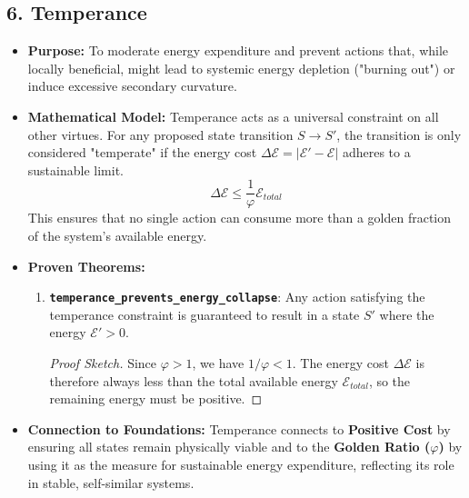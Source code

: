 \documentclass[11pt,a4paper]{article}
\begin{document}
\begin{itemize}
\subsection{6. Temperance}
\begin{itemize}
    \item \textbf{Purpose:} To moderate energy expenditure and prevent actions that, while locally beneficial, might lead to systemic energy depletion ("burning out") or induce excessive secondary curvature.
    \item \textbf{Mathematical Model:} Temperance acts as a universal constraint on all other virtues. For any proposed state transition $S \to S'$, the transition is only considered "temperate" if the energy cost $\Delta \mathcal{E} = |\mathcal{E}' - \mathcal{E}|$ adheres to a sustainable limit.
        \[ \Delta \mathcal{E} \le \frac{1}{\varphi} \mathcal{E}_{total} \]
        This ensures that no single action can consume more than a golden fraction of the system's available energy.
    \item \textbf{Proven Theorems:}
        \begin{enumerate}
            \item \textbf{\texttt{temperance\_prevents\_energy\_collapse}}: Any action satisfying the temperance constraint is guaranteed to result in a state $S'$ where the energy $\mathcal{E}' > 0$.
                \begin{proof}[Proof Sketch]
                    Since $\varphi > 1$, we have $1/\varphi < 1$. The energy cost $\Delta \mathcal{E}$ is therefore always less than the total available energy $\mathcal{E}_{total}$, so the remaining energy must be positive.
                \end{proof}
        \end{enumerate}
    \item \textbf{Connection to Foundations:} Temperance connects to \textbf{Positive Cost} by ensuring all states remain physically viable and to the \textbf{Golden Ratio ($\varphi$)} by using it as the measure for sustainable energy expenditure, reflecting its role in stable, self-similar systems.
\end{itemize}


\end{itemize}
\end{document}
